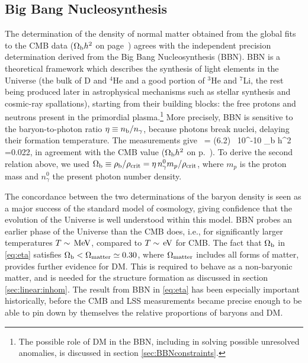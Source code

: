 \subsection{Big Bang Nucleosynthesis}
\label{sec:BBN}
The determination of the density of normal matter obtained from the global fits to the CMB data ($\Omega_{\rm b} h^2$ on page~\pageref{eq:Omegabh2}) agrees with the independent precision determination derived from the Big Bang Nucleosynthesis (BBN).  
BBN is a theoretical framework which describes the synthesis of light elements in the Universe (the bulk of D and $^4$He and a good portion of $^3$He and $^7$Li, the rest being produced later in astrophysical mechanisms such as stellar synthesis and cosmic-ray spallations), starting from their building blocks: the free protons and neutrons present in the primordial plasma.\footnote{The possible role of DM in the BBN, including in solving possible unresolved anomalies, is discussed in section \ref{sec:BBNconstraints}.}  
More precisely, BBN is sensitive to the baryon-to-photon ratio $\eta \equiv  n_{\rm b}/n_\gamma$, 
because photons break nuclei, delaying their formation temperature. 
The measurements give~\cite{PDG} 
\beq
\label{eq:eta}
\eta = (6.2) ~10^{-10}
\qquad\Rightarrow\qquad
 \Omega_{\rm b} h^2 =0.022, 
\eeq
 in agreement with the CMB value ($\Omega_{\rm b} h^2$ on p.~\pageref{eq:Omegabh2}).
To derive the second relation above, we used  $\Omega_{\rm b} \equiv \rho_{\rm b}/\rho_{\rm crit}= \eta \, n^0_\gamma m_p/\rho_{\rm crit}$, where $m_p$ is the proton mass and $n_\gamma^0$ the present photon number density.

The concordance between the two determinations of the baryon density is seen as a major success of the standard model of cosmology, giving confidence that the evolution of the Universe is well understood within this model. BBN probes an earlier phase of the Universe than the CMB does, i.e., for significantly larger  temperatures $T\sim \,{\rm MeV}$, compared to $T\sim \,{\rm eV}$ for CMB.
The fact that $\Omega_{\rm b}$ in  \eqref{eq:eta} satisfies $\Omega_{\rm b} < \Omega_{\rm matter} \simeq 0.30$, where $\Omega_{\rm matter} $ includes all forms of matter, provides further evidence for DM. This is required to behave as a non-baryonic matter, and is needed for the structure formation as discussed in section \ref{sec:linear:inhom}. The result from BBN in \eqref{eq:eta} has been especially important historically, before the CMB and LSS measurements became precise enough to be able to pin down by themselves the relative proportions of baryons and DM. 


